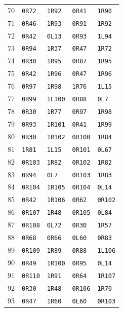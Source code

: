 {\begin{longtable}{rllll}
70 & \texttt{0R72} & \texttt{1R92} & \texttt{0R41} & \texttt{1R90}\\
71 & \texttt{0R46} & \texttt{1R93} & \texttt{0R91} & \texttt{1R92}\\
72 & \texttt{0R42} & \texttt{0L13} & \texttt{0R93} & \texttt{1L94}\\
73 & \texttt{0R94} & \texttt{1R37} & \texttt{0R47} & \texttt{1R72}\\
74 & \texttt{0R30} & \texttt{1R95} & \texttt{0R87} & \texttt{1R95}\\
75 & \texttt{0R42} & \texttt{1R96} & \texttt{0R47} & \texttt{1R96}\\
76 & \texttt{0R97} & \texttt{1R98} & \texttt{1R76} & \texttt{1L15}\\
77 & \texttt{0R99} & \texttt{1L100} & \texttt{0R88} & \texttt{0L7}\\
78 & \texttt{0R30} & \texttt{1R77} & \texttt{0R97} & \texttt{1R98}\\
79 & \texttt{0R93} & \texttt{1R101} & \texttt{0R41} & \texttt{1R99}\\
80 & \texttt{0R30} & \texttt{1R102} & \texttt{0R100} & \texttt{1R84}\\
81 & \texttt{1R81} & \texttt{1L15} & \texttt{0R101} & \texttt{0L67}\\
82 & \texttt{0R103} & \texttt{1R82} & \texttt{0R102} & \texttt{1R82}\\
83 & \texttt{0R94} & \texttt{0L7} & \texttt{0R103} & \texttt{1R83}\\
84 & \texttt{0R104} & \texttt{1R105} & \texttt{0R104} & \texttt{0L14}\\
85 & \texttt{0R42} & \texttt{1R106} & \texttt{0R62} & \texttt{0R102}\\
86 & \texttt{0R107} & \texttt{1R48} & \texttt{0R105} & \texttt{0L84}\\
87 & \texttt{0R108} & \texttt{0L72} & \texttt{0R30} & \texttt{1R57}\\
88 & \texttt{0R68} & \texttt{0R66} & \texttt{0L60} & \texttt{0R83}\\
89 & \texttt{0R109} & \texttt{1R89} & \texttt{0R88} & \texttt{1L106}\\
90 & \texttt{0R49} & \texttt{1R100} & \texttt{0R95} & \texttt{0L14}\\
91 & \texttt{0R110} & \texttt{1R91} & \texttt{0R64} & \texttt{1R107}\\
92 & \texttt{0R30} & \texttt{1R48} & \texttt{0R106} & \texttt{1R70}\\
93 & \texttt{0R47} & \texttt{1R60} & \texttt{0L60} & \texttt{0R103}\\

\end{longtable}}

